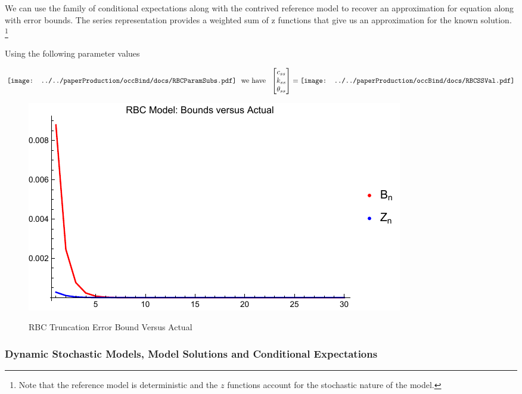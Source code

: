 \documentclass[12pt]{article}
\begin{document}
We can use the family of conditional expectations
along with the contrived reference model to recover an 
approximation for equation  along with error bounds.
The series representation provides a weighted sum of z functions that give us
an approximation for the known solution.
\footnote{Note that the reference model is deterministic and the $z$ functions account for the stochastic nature of the model.}

Using the following parameter values

\begin{gather}
\vcenter{\hbox{\texttt{[image: ../../paperProduction/occBind/docs/RBCParamSubs.pdf]}}} \,\, \text{ we have } \,\,
  \begin{bmatrix}
    c_{ss}\\k_{ss} \\ \theta_{ss} \label{rbcparams}
  \end{bmatrix}=
\vcenter{\hbox{\texttt{[image: ../../paperProduction/occBind/docs/RBCSSVal.pdf]}}}
\end{gather}%


\begin{figure}
  \centering
\includegraphics{simpBoundsVActual.pdf}  
  \label{rbcTrunc}
  \caption{RBC Truncation Error Bound Versus Actual}
\end{figure}






\subsubsection{Dynamic Stochastic Models, Model Solutions  and Conditional Expectations}
\label{sec:condExp}
\end{document}

